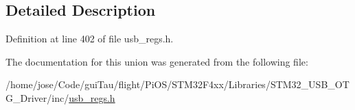 \begin{DoxyCompactItemize}
\begin{tabbing}
\end{tabbing}\end{DoxyCompactItemize}


\subsection{Detailed Description}


Definition at line 402 of file usb\-\_\-regs.\-h.



The documentation for this union was generated from the following file\-:\begin{DoxyCompactItemize}
\item 
/home/jose/\-Code/gui\-Tau/flight/\-Pi\-O\-S/\-S\-T\-M32\-F4xx/\-Libraries/\-S\-T\-M32\-\_\-\-U\-S\-B\-\_\-\-O\-T\-G\-\_\-\-Driver/inc/\hyperlink{_s_t_m32_f4xx_2_libraries_2_s_t_m32___u_s_b___o_t_g___driver_2inc_2usb__regs_8h}{usb\-\_\-regs.\-h}\end{DoxyCompactItemize}
